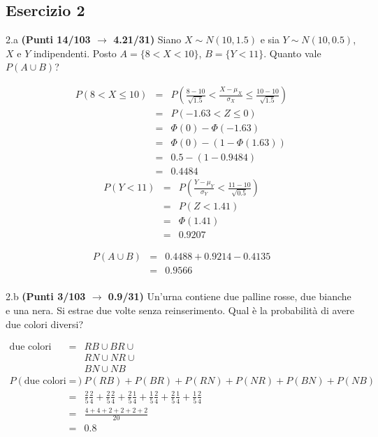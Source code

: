 \documentclass[
  11pt,
]{book}
\theoremstyle{mytheoremstyle}
\theoremstyle{mydefstyle}
\newenvironment{sol}
  {
  \begin{tcolorbox}[enhanced,breakable,arc=0.1mm,boxrule=1pt,colback=white,colframe=iblue,
  title=\bf \fontfamily{lmss}\selectfont \hspace{.5 cm} Soluzione,drop fuzzy shadow]

}{
\end{tcolorbox}
  }
\begin{document}
\subsection{Esercizio 2}\label{esercizio-2-19}

2.a \textbf{(Punti 14/103 \(\rightarrow\) 4.21/31)} Siano \(X\sim N(10,1.5)\) e sia \(Y\sim N(10,0.5)\), \(X\) e \(Y\) indipendenti. Posto \(A=\{8<X<10\}\), \(B=\{Y<11\}\).
Quanto vale \(P(A\cup B)\)?

\begin{sol}
\begin{eqnarray*}
   P( 8 < X \leq  10 ) &=& P\left( \frac { 8  -  10 }{\sqrt{ 1.5 }} < \frac { X  -  \mu_X }{ \sigma_X } \leq \frac { 10  -  10 }{\sqrt{ 1.5 }}\right)  \\
              &=& P\left(  -1.63  < Z \leq  0 \right) \\
              &=& \Phi( 0 )-\Phi( -1.63 )\\
              &=&  \Phi( 0 )-(1-\Phi( 1.63 )) \\ &=&  0.5 -(1- 0.9484 ) \\ 
              &=&  0.4484 
   \end{eqnarray*}
\begin{eqnarray*}
      P( Y   <   11 ) 
        &=& P\left(  \frac { Y  -  \mu_Y }{ \sigma_Y }  <  \frac { 11  -  10 }{\sqrt{ 0.5 }} \right)  \\
                 &=& P\left(  Z   <   1.41 \right) \\    
                 &=&  \Phi( 1.41 ) \\ &=&  0.9207 
      \end{eqnarray*}

\begin{eqnarray*}
  P(A\cup B) &=&  0.4488+ 0.9214-0.4135\\
             &=&  0.9566\\
\end{eqnarray*}

\end{sol}

2.b \textbf{(Punti 3/103 \(\rightarrow\) 0.9/31)} Un'urna contiene due palline rosse, due bianche e una nera. Si estrae due volte senza reinserimento. Qual è la probabilità di avere due colori diversi?

\begin{sol}
\begin{eqnarray*}
  \text{due colori diversi} &=& RB\cup BR \cup\\
                            &&  RN\cup NR \cup\\
                            &&  BN\cup NB\\
  P(\text{due colori diversi}) &=& P(RB)+P(BR)+P(RN)+P(NR)+P(BN)+P(NB)\\
  &=& \frac 25\frac 24+\frac 25\frac 24+\frac 25\frac 14+\frac 15\frac 24+\frac 25\frac 14+\frac 15\frac 24\\
  &=& \frac{4+4+2+2+2+2}{20}\\
  &=& 0.8
\end{eqnarray*}

\end{sol}
\end{document}
